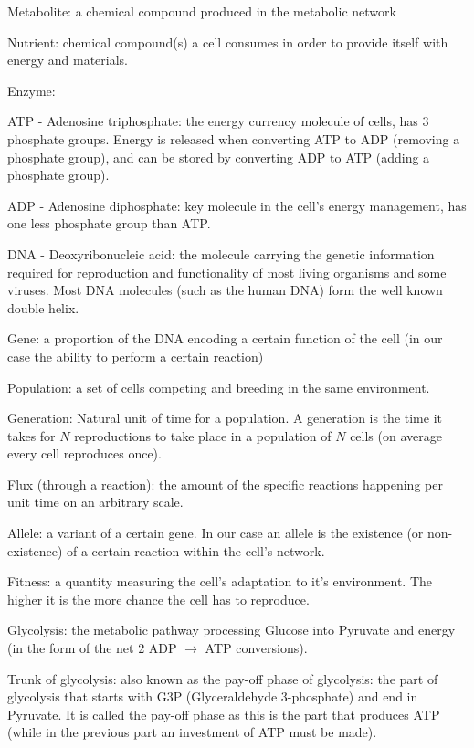 \documentclass[a4paper,12pt]{article}
\begin{document}
	\begin{framed}

	Metabolite: a chemical compound produced in the metabolic network

	Nutrient: chemical compound(s) a cell consumes in order to provide itself with energy and materials.

	Enzyme:

	ATP - Adenosine triphosphate: the energy currency molecule of cells, has 3 phosphate groups. Energy is released when converting ATP to ADP (removing a phosphate group), and can be stored by converting ADP to ATP (adding a phosphate group).

	ADP - Adenosine diphosphate: key molecule in the cell's energy management, has one less phosphate group than ATP.

	DNA - Deoxyribonucleic acid: the molecule carrying the genetic information required for reproduction and functionality of most living organisms and some viruses. Most DNA molecules (such as the human DNA) form the well known double helix. 

	Gene: a proportion of the DNA encoding a certain function of the cell (in our case the ability to perform a certain reaction)

	Population: a set of cells competing and breeding in the same environment.

	Generation: Natural unit of time for a population. A generation is the time it takes for $N$ reproductions to take place in a population of $N$ cells (on average every cell reproduces once).

	Flux (through a reaction): the amount of the specific reactions happening per unit time on an arbitrary scale. 

	Allele: a variant of a certain gene. In our case an allele is the existence (or non-existence) of a certain reaction within the cell's network.

	Fitness: a quantity measuring the cell's adaptation to it's environment. The higher it is the more chance the cell has to reproduce.

	Glycolysis: the metabolic pathway processing Glucose into Pyruvate and energy (in the form of the net 2 ADP $\rightarrow$ ATP conversions).

	Trunk of glycolysis: also known as the pay-off phase of glycolysis: the part of glycolysis that starts with G3P (Glyceraldehyde 3-phosphate) and end in Pyruvate. It is called the pay-off phase as this is the part that produces ATP (while in the previous part an investment of ATP must be made).

	\end{framed}
\end{document}
